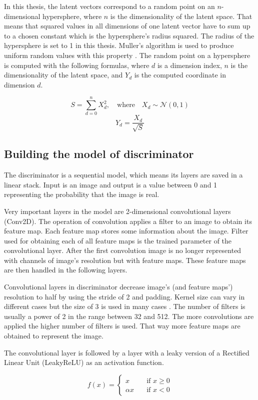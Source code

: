 In this thesis, the latent vectors correspond to a random point on an $n$-dimensional hypersphere, where $n$ is the dimensionality of the latent space. That means that squared values in all dimensions of one latent vector have to sum up to a chosen constant which is the hypersphere's radius squared. The radius of the hypersphere is set to 1 in this thesis. Muller's algorithm is used to produce uniform random values with this property \cite{marsaglia1972}. The random point on a hypersphere is computed with the following formulas, where $d$ is a dimension index, $n$ is the dimensionality of the latent space, and $Y_d$ is the computed coordinate in dimension $d$. 

$$ S = \sum\limits_{d=0}^n X_d^2, \quad \text{where} \quad X_d \sim \mathcal{N}(0, 1)$$
$$ Y_d = \frac{X_d}{\sqrt{S}} $$

\subsection*{Building the model of discriminator}
The discriminator is a sequential model, which means its layers are saved in a linear stack. Input is an image and output is a value between 0 and 1 representing the probability that the image is real.

Very important layers in the model are 2-dimensional convolutional layers (Conv2D). The operation of convolution applies a filter to an image to obtain its feature map. Each feature map stores some information about the image. Filter used for obtaining each of all feature maps is the trained parameter of the convolutional layer. After the first convolution image is no longer represented with channels of image's resolution but with feature maps. These feature maps are then handled in the following layers.

Convolutional layers in discriminator decrease image's (and feature maps') resolution to half by using the stride of 2 and  padding. Kernel size can vary in different cases but the size of 3 is used in many cases \cite{karras2017progressive}. The number of filters is usually a power of 2 in the range between 32 and 512. The more convolutions are applied the higher number of filters is used. That way more feature maps are obtained to represent the image.

The convolutional layer is followed by a layer with a leaky version of a Rectified Linear Unit (LeakyReLU) as an activation function.

$$ f(x) =
    \begin{cases}
        x           & \quad \text{if } x \geq 0 \\
        \alpha x    & \quad \text{if } x < 0
    \end{cases}
$$

